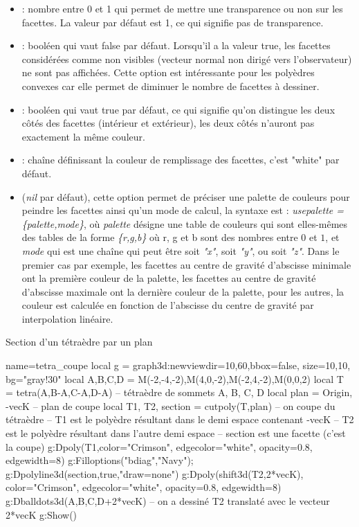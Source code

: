 \begin{itemize}
        \item {} : nombre entre 0 et 1 qui permet de mettre une transparence ou non sur les facettes. La valeur par défaut est 1, ce qui signifie pas de transparence.
        \item {} : booléen qui vaut false par défaut. Lorsqu'il a la valeur true, les facettes considérées comme non visibles (vecteur normal non dirigé vers l'observateur) ne sont pas affichées. Cette option est intéressante pour les polyèdres convexes car elle permet de diminuer le nombre de facettes à dessiner.
        \item {} : booléen qui vaut true par défaut, ce qui signifie qu'on distingue les deux côtés des facettes (intérieur et extérieur), les deux côtés n'auront pas exactement la même couleur.
        \item {} : chaîne définissant la couleur de remplissage des facettes, c'est "white" par défaut.
        \item {} (\emph{nil} par défaut), cette option permet de préciser une palette de couleurs pour peindre les facettes ainsi qu'un mode de calcul, la syntaxe est : \emph{usepalette = \{palette,mode\}}, où \emph{palette} désigne une table de couleurs qui sont elles-mêmes des tables de la forme \emph{\{r,g,b\}} où r, g et b sont des nombres entre $0$ et $1$, et \emph{mode} qui est une chaîne qui peut être soit \emph{"x"}, soit \emph{"y"}, ou soit \emph{"z"}. Dans le premier cas par exemple, les facettes au centre de gravité d'abscisse minimale ont la première couleur de la palette, les facettes au centre de gravité d'abscisse maximale ont la dernière couleur de la palette, pour les autres, la couleur est calculée en fonction de l'abscisse du centre de gravité par interpolation linéaire.
\end{itemize}

\begin{demo}{Section d'un tétraèdre par un plan}
\begin{luadraw}{name=tetra_coupe}
local g = graph3d:new{viewdir={10,60},bbox=false, size={10,10}, bg="gray!30"}
local A,B,C,D = M(-2,-4,-2),M(4,0,-2),M(-2,4,-2),M(0,0,2)
local T = tetra(A,B-A,C-A,D-A) -- tétraèdre de sommets A, B, C, D
local plan = {Origin, -vecK}  -- plan de coupe
local T1, T2, section = cutpoly(T,plan) -- on coupe du tétraèdre
-- T1 est le polyèdre résultant dans le demi espace contenant -vecK
-- T2 est le polyèdre résultant dans l'autre demi espace
-- section est une facette (c'est la coupe)
g:Dpoly(T1,{color="Crimson", edgecolor="white", opacity=0.8, edgewidth=8})
g:Filloptions("bdiag","Navy"); g:Dpolyline3d(section,true,"draw=none")
g:Dpoly(shift3d(T2,2*vecK), {color="Crimson", edgecolor="white", opacity=0.8, edgewidth=8})
g:Dballdots3d({A,B,C,D+2*vecK}) -- on a dessiné T2 translaté avec le vecteur 2*vecK
g:Show()
\end{luadraw}
\end{demo}

